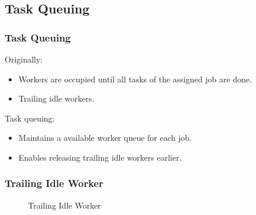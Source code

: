 \subsection{Task Queuing}
\begin{frame}
  \frametitle{Task Queuing}
  Originally:
  \begin{itemize}
    \item Workers are occupied until all tasks of the assigned job are
      done.
    \item Trailing idle workers.
  \end{itemize}
  Task queuing:
  \begin{itemize}
    \item Maintains a available worker queue for each job.
    \item Enables releasing trailing idle workers earlier.
  \end{itemize}
\end{frame}

\begin{frame}
  \frametitle{Trailing Idle Worker}

  \begin{figure}[h]
    \centering
    \resizebox{\textheight}{!}{
      
    }
    \caption{Trailing Idle Worker}
  \end{figure}
\end{frame}

